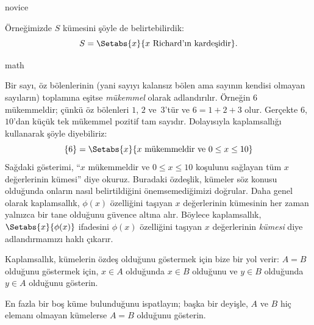 \documentclass[../../../include/open-logic-section]{subfiles}
\begin{document}
\begin{tagblock}{novice}
\begin{ex}
Örneğimizde $S$ kümesini şöyle de belirtebilirdik:
\[
S = \Setabs{x}{x \text{ Richard'ın kardeşidir}}.
\]
\end{ex}
\end{tagblock}

\begin{tagblock}{math}
\begin{ex}
Bir sayı, öz bölenlerinin (yani sayıyı kalansız bölen ama sayının kendisi
olmayan sayıların) toplamına eşitse \emph{mükemmel} olarak adlandırılır.
Örneğin $6$ mükemmeldir; çünkü öz bölenleri $1$, $2$ ve~$3$'tür ve
$6 = 1 + 2 + 3$ olur. Gerçekte $6$, $10$'dan küçük tek mükemmel pozitif tam
sayıdır. Dolayısıyla kaplamsallığı
kullanarak şöyle diyebiliriz:
\[
	\{6\} = \Setabs{x}{x\text{ mükemmeldir ve }0 \leq x \leq 10}
\]
Sağdaki gösterimi, ``$x$ mükemmeldir ve $0 \leq x \leq 10$ koşulunu sağlayan
tüm $x$ değerlerinin kümesi'' diye okuruz. Buradaki özdeşlik, kümeler söz
konusu olduğunda onların nasıl belirtildiğini önemsemediğimizi doğrular. Daha
genel olarak kaplamsallık, $\phi(x)$ özelliğini taşıyan $x$ değerlerinin
kümesinin her zaman yalnızca bir tane olduğunu güvence altına alır. Böylece
kaplamsallık, $\Setabs{x}{\phi(x)}$ ifadesini $\phi(x)$ özelliğini taşıyan
$x$ değerlerinin \emph{kümesi} diye adlandırmamızı haklı çıkarır.
\end{ex}
\end{tagblock}

Kaplamsallık, kümelerin özdeş olduğunu göstermek için bize bir yol verir:
$A = B$ olduğunu göstermek için, $x \in A$ olduğunda $x \in B$ olduğunu ve
$y \in B$ olduğunda $y \in A$ olduğunu gösterin.

\begin{prob}
En fazla bir boş küme bulunduğunu ispatlayın; başka bir deyişle, $A$ ve $B$
hiç elemanı olmayan kümelerse $A = B$ olduğunu gösterin.
\end{prob}
\end{document}
